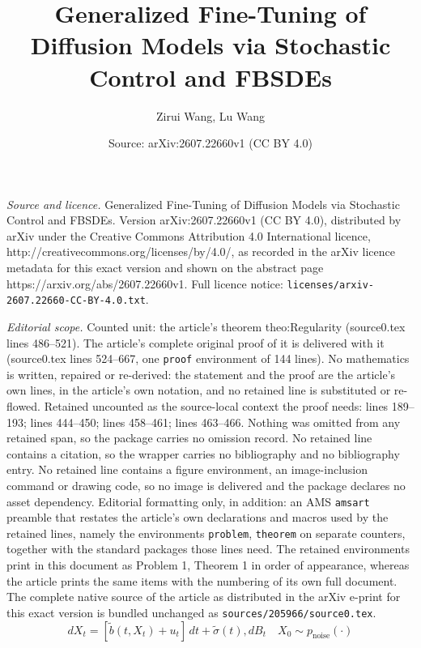 \documentclass[10pt,a4paper]{amsart}
\title{Generalized Fine-Tuning of Diffusion Models via Stochastic Control and FBSDEs}
\author{Zirui Wang, Lu Wang}
\date{Source: arXiv:2607.22660v1 (CC BY 4.0)}
\def\w{\widetilde}
\begin{document}
\maketitle

\noindent\emph{Source and licence.} Generalized Fine-Tuning of Diffusion Models via Stochastic Control and FBSDEs. Version arXiv:2607.22660v1 (CC BY 4.0), distributed by arXiv under the Creative Commons Attribution 4.0 International licence, http://creativecommons.org/licenses/by/4.0/, as recorded in the arXiv licence metadata for this exact version and shown on the abstract page https://arxiv.org/abs/2607.22660v1. Full licence notice: \texttt{licenses/arxiv-2607.22660-CC-BY-4.0.txt}.\par\smallskip

\noindent\textit{Editorial scope.} Counted unit: the article's theorem theo:Regularity (source0.tex lines 486--521). The article's complete original proof of it is delivered with it (source0.tex lines 524--667, one \texttt{proof} environment of 144 lines). No mathematics is written, repaired or re-derived: the statement and the proof are the article's own lines, in the article's own notation, and no retained line is substituted or re-flowed.  Retained uncounted as the source-local context the proof needs: lines 189--193; lines 444--450; lines 458--461; lines 463--466.  Nothing was omitted from any retained span, so the package carries no omission record.  No retained line contains a citation, so the wrapper carries no bibliography and no bibliography entry.  No retained line contains a figure environment, an image-inclusion command or drawing code, so no image is delivered and the package declares no asset dependency.  Editorial formatting only, in addition: an AMS \texttt{amsart} preamble that restates the article's own declarations and macros used by the retained lines, namely the environments \texttt{problem}, \texttt{theorem} on separate counters, together with the standard packages those lines need.  The retained environments print in this document as Problem 1, Theorem 1 in order of appearance, whereas the article prints the same items with the numbering of its own full document.  The complete native source of the article as distributed in the arXiv e-print for this exact version is bundled unchanged as \texttt{sources/205966/source0.tex}.
\begin{equation}
\label{state}
d X_t = [\w{b}(t,{X}_t)+u_t ]\, dt +  \w{\sigma}(t), dB_t
\quad X_0 \sim  p_{\text{noise}}(\cdot)
\end{equation}
\end{document}
